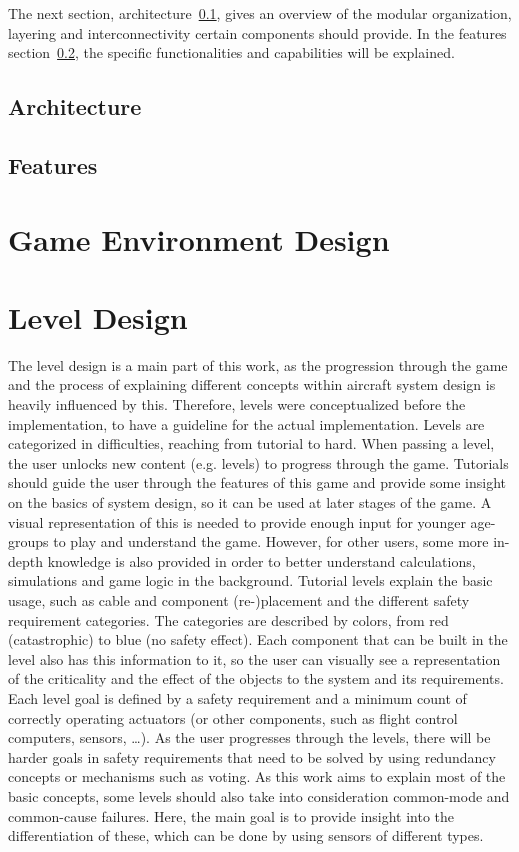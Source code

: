 The next section, architecture~\ref{subsec:architecture}, gives an overview of the modular organization, layering and interconnectivity certain
components should provide.
In the features section~\ref{subsec:features}, the specific functionalities and capabilities will be explained.
\subsection{Architecture}\label{subsec:architecture}

\subsection{Features}\label{subsec:features}

\section{Game Environment Design}\label{sec:game-environment-design}

\section{Level Design}\label{sec:level-design}
The level design is a main part of this work, as the progression through the game and the process of explaining different concepts
within aircraft system design is heavily influenced by this.
Therefore, levels were conceptualized before the implementation, to have a guideline for the actual implementation.
Levels are categorized in difficulties, reaching from tutorial to hard.
When passing a level, the user unlocks new content (e.g. levels) to progress through the game.
Tutorials should guide the user through the features of this game and provide some insight on the basics of system design, so
it can be used at later stages of the game.
A visual representation of this is needed to provide enough input for younger age-groups to play and understand the game.
However, for other users, some more in-depth knowledge is also provided in order to better understand calculations, simulations and
game logic in the background.
Tutorial levels explain the basic usage, such as cable and component (re-)placement and the different safety requirement
categories.
The categories are described by colors, from red (catastrophic) to blue (no safety effect).
Each component that can be built in the level also has this information to it, so the user can visually see a representation
of the criticality and the effect of the objects to the system and its requirements.
Each level goal is defined by a safety requirement and a minimum count of correctly operating actuators (or other components, such
as flight control computers, sensors, \ldots).
As the user progresses through the levels, there will be harder goals in safety requirements that need to be solved by using
redundancy concepts or mechanisms such as voting.
As this work aims to explain most of the basic concepts, some levels should also take into consideration common-mode and common-cause
failures.
Here, the main goal is to provide insight into the differentiation of these, which can be done by using sensors of different types.

